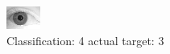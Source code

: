 \begin{figure}[h!]
\begin{center}
\includegraphics[width=0.60\columnwidth]{figures/ID2137_class_4_target_3.png}
\end{center}
\caption{ Classification: 4 actual target: 3}
\label{fig:ID2137_class_4_target_3}
\end{figure}
